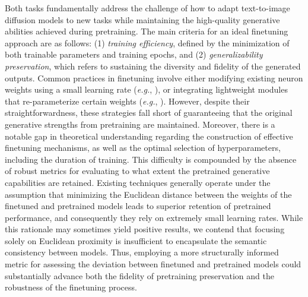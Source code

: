Both tasks fundamentally address the challenge of how to adapt text-to-image diffusion models to new tasks while maintaining the high-quality generative abilities achieved during pretraining. The main criteria for an ideal finetuning approach are as follows: (1) \emph{training efficiency}, defined by the minimization of both trainable parameters and training epochs, and (2) \emph{generalizability preservation}, which refers to sustaining the diversity and fidelity of the generated outputs. Common practices in finetuning involve either modifying existing neuron weights using a small learning rate (\emph{e.g.}, \cite{ruiz2023dreambooth}), or integrating lightweight modules that re-parameterize certain weights (\emph{e.g.}, \cite{hulora2022,zhang2023adding}). However, despite their straightforwardness, these strategies fall short of guaranteeing that the original generative strengths from pretraining are maintained. Moreover, there is a notable gap in theoretical understanding regarding the construction of effective finetuning mechanisms, as well as the optimal selection of hyperparameters, including the duration of training. This difficulty is compounded by the absence of robust metrics for evaluating to what extent the pretrained generative capabilities are retained. Existing techniques generally operate under the assumption that minimizing the Euclidean distance between the weights of the finetuned and pretrained models leads to superior retention of pretrained performance, and consequently they rely on extremely small learning rates. While this rationale may sometimes yield positive results, we contend that focusing solely on Euclidean proximity is insufficient to encapsulate the semantic consistency between models. Thus, employing a more structurally informed metric for assessing the deviation between finetuned and pretrained models could substantially advance both the fidelity of pretraining preservation and the robustness of the finetuning process.

